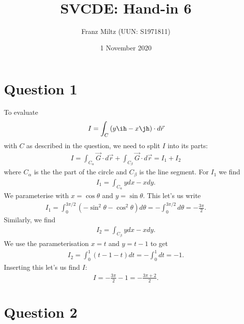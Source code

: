\documentclass{article}
\begin{document}
\title{SVCDE: Hand-in 6}
\author{Franz Miltz (UUN: S1971811)}
\date{1 November 2020}
\maketitle


\section*{Question 1}


To evaluate
\begin{align*}
	I=\int_C \left(y\ih - x\jh\right)\cdot d\vec r
\end{align*}
with $C$ as described in the question, we need to split $I$ into its
parts:
\begin{align*}
	I = \int_{C_\alpha} \vec G \cdot d\vec r + \int_{C_\beta} \vec G \cdot d\vec r = I_1 + I_2
\end{align*}
where $C_\alpha$ is the the part of the circle and $C_\beta$ is the line segment.
For $I_1$ we find
\begin{align*}
	I_1 = \int_{C_\alpha} ydx-xdy.
\end{align*}
We parameterise with $x=\cos\theta$ and $y=\sin\theta$.
This let's us write
\begin{align*}
	I_1 = \int_0^{3\pi/2} \left(-\sin^2\theta - \cos^2\theta\right) d\theta
	=-\int_0^{3\pi/2}d\theta=-\frac{3\pi}{2}.
\end{align*}
Similarly, we find
\begin{align*}
	I_2 = \int_{C_\beta} ydx-xdy.
\end{align*}
We use the parameterisation $x=t$ and $y=t-1$ to get
\begin{align*}
	I_2 = \int_0^1 (t-1-t)dt=-\int_0^1 dt = -1.
\end{align*}
Inserting this let's us find $I$:
\begin{align*}
	I = -\frac{3\pi}{2}-1 = -\frac{3\pi + 2}{2}.
\end{align*}


\section*{Question 2}
\end{document}

